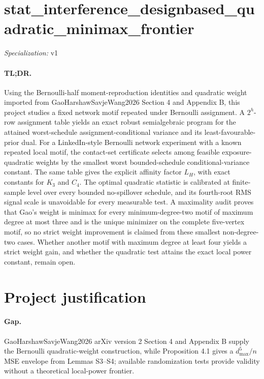 \documentclass{article}
\begin{document}
\sloppy

\section*{stat\_\allowbreak{}interference\_\allowbreak{}designbased\_\allowbreak{}quadratic\_\allowbreak{}minimax\_\allowbreak{}frontier}

\noindent\textit{Specialization:} v1\par

\paragraph{TL;DR.} Using the Bernoulli-half moment-reproduction identities and quadratic weight imported from GaoHarshawSavjeWang2026 Section 4 and Appendix B, this project studies a fixed network motif repeated under Bernoulli assignment. A \(2^h\)-row assignment table yields an exact robust semialgebraic program for the attained worst-schedule assignment-conditional variance and its least-favourable-prior dual. For a LinkedIn-style Bernoulli network experiment with a known repeated local motif, the contact-set certificate selects among feasible exposure-quadratic weights by the smallest worst bounded-schedule conditional-variance constant. The same table gives the explicit affinity factor \(L_H\), with exact constants for \(K_3\) and \(C_4\). The optimal quadratic statistic is calibrated at finite-sample level over every bounded no-spillover schedule, and its fourth-root RMS signal scale is unavoidable for every measurable test. A maximality audit proves that Gao's weight is minimax for every minimum-degree-two motif of maximum degree at most three and is the unique minimizer on the complete five-vertex motif, so no strict weight improvement is claimed from these smallest non-degree-two cases. Whether another motif with maximum degree at least four yields a strict weight gain, and whether the quadratic test attains the exact local power constant, remain open.

\section{Project justification}

\paragraph{Gap.} GaoHarshawSavjeWang2026 arXiv version 2 Section 4 and Appendix B supply the Bernoulli quadratic-weight construction, while Proposition 4.1 gives a \(d_{\max}^5/n\) MSE envelope from Lemmas S3--S4; available randomization tests provide validity without a theoretical local-power frontier.
\end{document}
